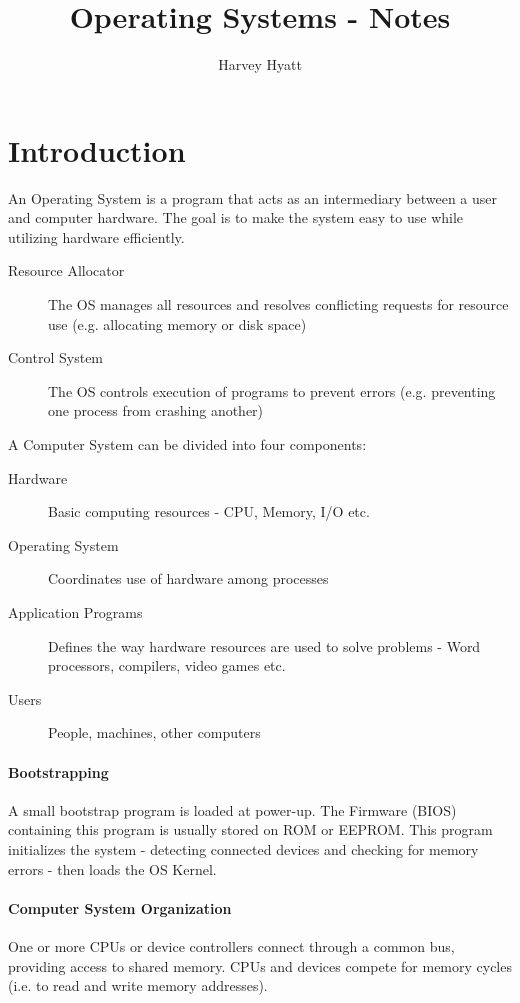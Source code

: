 \documentclass{article}
\title{Operating Systems - Notes}
\author{Harvey Hyatt}
\date{}
\begin{document}
\maketitle

\section{Introduction}
An Operating System is a program that acts as an intermediary between a user and computer hardware. The goal is to make the system easy to use while utilizing hardware efficiently.
\begin{description}
\item[Resource Allocator] The OS manages all resources and resolves conflicting requests for resource use (e.g. allocating memory or disk space)
\item[Control System] The OS controls execution of programs to prevent errors (e.g. preventing one process from crashing another)
\end{description}
A Computer System can be divided into four components:
\begin{description}
\item[Hardware] Basic computing resources - CPU, Memory, I/O etc.
\item[Operating System] Coordinates use of hardware among processes
\item[Application Programs] Defines the way hardware resources are used to solve problems - Word processors, compilers, video games etc.
\item[Users] People, machines, other computers
\end{description}
\paragraph{Bootstrapping}
A small bootstrap program is loaded at power-up. The Firmware (BIOS) containing this program is usually stored on ROM or EEPROM. This program initializes the system - detecting connected devices and checking for memory errors - then loads the OS Kernel.
\paragraph{Computer System Organization}
\begin{center}
\end{center}
One or more CPUs or device controllers connect through a common bus, providing access to shared memory. CPUs and devices compete for memory cycles (i.e. to read and write memory addresses).
\end{document}
